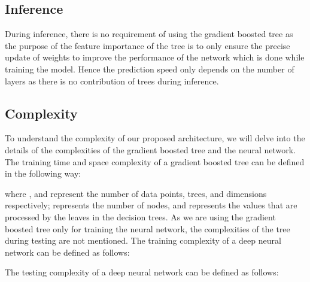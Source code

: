 \documentclass[review]{elsarticle}
\begin{document}
\subsection{Inference}
During inference, there is no requirement of using the gradient boosted tree as the purpose of the feature importance of the tree is to only ensure the precise update of weights to improve the performance of the network which is done while training the model. Hence the prediction speed only depends on the number of layers as there is no contribution of trees during inference. 

\subsection{Complexity}
 To understand the complexity of our proposed architecture, we will delve into the details of the complexities of the gradient boosted tree and the neural network.
 The training time and space complexity of a gradient boosted tree can be defined in the following way:
 
 
 where ,  and  represent the number of data points, trees, and dimensions respectively;  represents the number of nodes, and  represents the values that are processed by the leaves in the decision trees. As we are using the gradient boosted tree only for training the neural network, the complexities of the tree during testing are not mentioned.
 The training complexity of a deep neural network can be defined as follows:
 
 
 The testing complexity of a deep neural network can be defined as follows:
 
 
 
\end{document}
